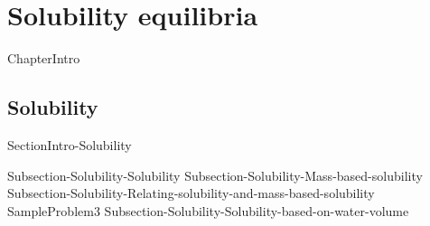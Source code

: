 \documentclass[main.tex]{subfiles}
\newcommand\chapterlabel{Ch-solubility}\setcounter{figurenewcounter}{0}\setcounter{tablenewcounter}{0}\setcounter{formulanewcounter}{0}\chapterpicture{../{\chapterlabel}/figure1}\chapterpicturelabel{imaggeo.egu.eu/view/195/}
\begin{document}
 \setcounter{chapter}{5}\chapter[Solubility equilibria ]{Solubility equilibria}





   {ChapterIntro}


%
%


\section{Solubility } {SectionIntro-Solubility}\sloppy\begin{description}
{Subsection-Solubility-Solubility}
{Subsection-Solubility-Mass-based-solubility}
{Subsection-Solubility-Relating-solubility-and-mass-based-solubility}
{SampleProblem3}
{Subsection-Solubility-Solubility-based-on-water-volume}
 \end{description}
  
\end{document}
